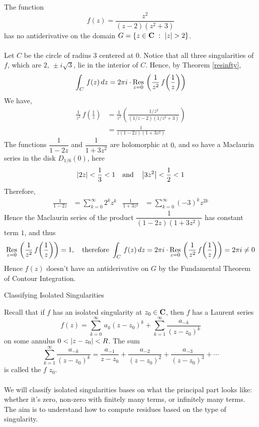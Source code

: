 \begin{example}
The function
\[f(z) = \frac{z^2}{(z - 2)(z^2 + 3)}\]
has no antiderivative on the domain $G = \left\{z \in \mathbf C\ :\ \left\lvert z\right\rvert > 2\right\}$.\\
\\
Let $C$ be the circle of radius $3$ centered at $0$. Notice that all three singularities of $f$, which are $2,\,\pm i\sqrt{3}$, lie in the interior of $C$. Hence, by Theorem \ref{resinfty},
\[\int_C\,f(z)\,dz = 2\pi i\cdot\underset{z = {0}}{\operatorname{Res}}\,\left(\frac{1}{z^2}\,f\!\left(\frac{1}{z}\right)\right)\]
We have,
\begin{align*}
\frac{1}{z^2}\,f\!\left(\frac{1}{z}\right) &= \frac{1}{z^2}\left(\frac{1/z^2}{(1/z - 2)(1/z^2 + 3)}\right)\\[0.5em]
 &= \frac{1}{z(1-2z)(1+3z^2)}
\end{align*}
The functions $\dfrac{1}{1 - 2z}$ and $\dfrac{1}{1 + 3z^2}$ are holomorphic at $0$,  and so have a Maclaurin series in the disk $D_{1/6}(0)$, here
\[\left\lvert2z\right\rvert < \frac{1}{3} < 1 \quad \text{and} \quad \left\lvert3z^2\right\rvert < \frac{1}{2} < 1\]
Therefore,
\begin{align*}
\frac{1}{1 - 2z} &= \sum_{k=0}^\infty 2^kz^k & \frac{1}{1 + 3z^2} &= \sum_{k=0}^\infty (-3)^kz^{2k}
\end{align*}
Hence the Maclaurin series of the product $\dfrac{1}{(1-2z)(1 + 3z^2)}$ has constant term $1$, and thus
\[\underset{z = {0}}{\operatorname{Res}}\,\left(\frac{1}{z^2}\,f\!\left(\frac{1}{z}\right)\right) = 1, \quad \text{therefore } \int_C\,f(z)\,dz = 2\pi i\cdot\underset{z = {0}}{\operatorname{Res}}\,\left(\frac{1}{z^2}\,f\!\left(\frac{1}{z}\right)\right) = 2\pi i \neq 0\]
Hence $f(z)$ doesn't have an antiderivative on $G$ by the Fundamental Theorem of Contour Integration.
\end{example}

\vspace*{2em}

\begin{mdframed}
\begin{center}
{\Large Classifying Isolated Singularities}
\end{center}
\end{mdframed}

\begin{discussion}
Recall that if $f$ has an isolated singularity at $z_0 \in \mathbf C$, then $f$ has a Laurent series
\[f(z) = \sum_{k=0}^\infty\,a_k(z - z_0)^k + \sum_{k=1}^\infty \frac{a_{-k}}{(z - z_0)^k}\]
on some annulus $0 < \left\lvert z - z_0\right\rvert < R$. The sum
\[\sum_{k=1}^\infty \frac{a_{-k}}{(z - z_0)^k} = \frac{a_{-1}}{z - z_0} + \frac{a_{-2}}{(z - z_0)^2} + \frac{a_{-3}}{(z - z_0)^3} + \cdots\]
is called the  {\color{blue}$f$}  {\color{blue}$z_0$}.\\
\\
We will classify isolated singularities bases on what the principal part looks like: whether it's zero, non-zero with finitely many terms, or infinitely many terms. The aim is to understand how to compute residues based on the type of singularity.
\end{discussion}


